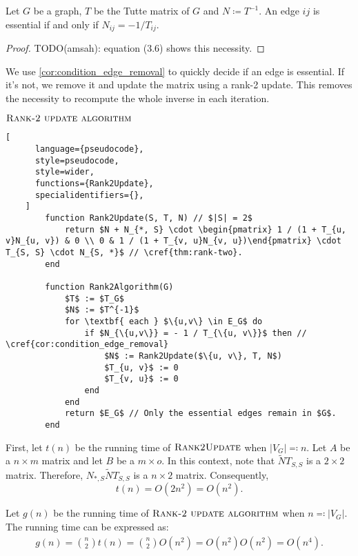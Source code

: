 \begin{corollary}
    \label{cor:condition_edge_removal}
    Let \(G\) be a graph, \(T\) be the Tutte matrix of \(G\) and \(N \coloneqq T^{-1}\).
    An edge \(ij\) is essential if and only if \(N_{ij} = -1/T_{ij}\).
\end{corollary}

\begin{proof}
    TODO(amsah): equation (3.6) shows this necessity.
\end{proof}

We use \cref{cor:condition_edge_removal} to quickly decide if an edge is essential. 
If it's not, we remove it and update the matrix using a rank-2 update. 
This removes the necessity to recompute the whole inverse in each iteration.

\begin{programruledcaption}{\(\textsc{Rank-2 update algorithm}\)}
    \begin{lstlisting}[
      language={pseudocode},
      style=pseudocode,
      style=wider,
      functions={Rank2Update},
      specialidentifiers={},
    ]
        function Rank2Update(S, T, N) // $|S| = 2$
            return $N + N_{*, S} \cdot \begin{pmatrix} 1 / (1 + T_{u, v}N_{u, v}) & 0 \\ 0 & 1 / (1 + T_{v, u}N_{v, u})\end{pmatrix} \cdot  T_{S, S} \cdot N_{S, *}$ // \cref{thm:rank-two}.
        end

        function Rank2Algorithm(G)
            $T$ := $T_G$
            $N$ := $T^{-1}$
            for \textbf{ each } $\{u,v\} \in E_G$ do
                if $N_{\{u,v\}} = - 1 / T_{\{u, v\}}$ then // \cref{cor:condition_edge_removal}
                    $N$ := Rank2Update($\{u, v\}, T, N$)
                    $T_{u, v}$ := 0
                    $T_{v, u}$ := 0
                end
            end
            return $E_G$ // Only the essential edges remain in $G$.
        end
    \end{lstlisting}
\end{programruledcaption}

First, let \(t(n)\) be the running time of \(\textsc{Rank2Update}\) when \(|V_G| \eqcolon n\).
Let \(A\) be a \(n \times m\) matrix and let \(B\) be a \(m \times o\).
In this context, note that \(\tilde{N}T_{S, S}\) is a \(2 \times 2\) matrix.
Therefore, \(N_{*, S}\tilde{N}T_{S, S}\) is a \(n \times 2\) matrix.
Consequently,
\[
    t(n) = O(2n^2) = O(n^2).
\]

Let \(g(n)\) be the running time of \(\textsc{Rank-2 update algorithm}\) when \(n \eqcolon |V_G|\).
The running time can be expressed as:
\begin{align*}
    g(n) = \binom{n}{2} t(n) = \binom{n}{2} O(n^2) = O(n^2) O(n^2) = O(n^4).
\end{align*}